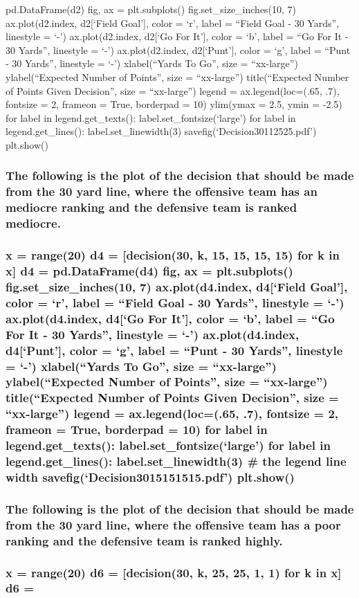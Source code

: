 \documentclass[letterpaper,10pt,english]{/anaconda/lib/python2.7/site-packages/sphinx/texinputs/sphinxhowto}
\begin{document}
{pd.DataFrame(d2) fig, ax = plt.subplots() fig.set\_size\_inches(10, 7)
ax.plot(d2.index, d2{[}`Field Goal'{]}, color = `r', label = ``Field
Goal - 30 Yards'', linestyle = `-') ax.plot(d2.index, d2{[}`Go For
It'{]}, color = `b', label = ``Go For It - 30 Yards'', linestyle = `-')
ax.plot(d2.index, d2{[}`Punt'{]}, color = `g', label = ``Punt - 30
Yards'', linestyle = `-') xlabel(``Yards To Go'', size = ``xx-large'')
ylabel(``Expected Number of Points'', size = ``xx-large'')
title(``Expected Number of Points Given Decision'', size = ``xx-large'')
legend = ax.legend(loc=(.65, .7), fontsize = 2, frameon = True,
borderpad = 10) ylim(ymax = 2.5, ymin = -2.5) for label in
legend.get\_texts(): label.set\_fontsize(`large') for label in
legend.get\_lines(): label.set\_linewidth(3)
savefig(`Decision30112525.pdf') plt.show()}\subsubsection{The following is the plot of the decision that should be made from the
30 yard line, where the offensive team has an mediocre ranking and the
defensive team is ranked mediocre.}\subsubsection{x = range(20) d4 = {[}decision(30, k, 15, 15, 15, 15) for k in x{]} d4 =
pd.DataFrame(d4) fig, ax = plt.subplots() fig.set\_size\_inches(10, 7)
ax.plot(d4.index, d4{[}`Field Goal'{]}, color = `r', label = ``Field
Goal - 30 Yards'', linestyle = `-') ax.plot(d4.index, d4{[}`Go For
It'{]}, color = `b', label = ``Go For It - 30 Yards'', linestyle = `-')
ax.plot(d4.index, d4{[}`Punt'{]}, color = `g', label = ``Punt - 30
Yards'', linestyle = `-') xlabel(``Yards To Go'', size = ``xx-large'')
ylabel(``Expected Number of Points'', size = ``xx-large'')
title(``Expected Number of Points Given Decision'', size = ``xx-large'')
legend = ax.legend(loc=(.65, .7), fontsize = 2, frameon = True,
borderpad = 10) for label in legend.get\_texts():
label.set\_fontsize(`large') for label in legend.get\_lines():
label.set\_linewidth(3) \# the legend line width
savefig(`Decision3015151515.pdf') plt.show()}\subsubsection{The following is the plot of the decision that should be made from the
30 yard line, where the offensive team has a poor ranking and the
defensive team is ranked highly.}\subsubsection{x = range(20) d6 = {[}decision(30, k, 25, 25, 1, 1) for k in x{]} d6 =
}
\end{document}
